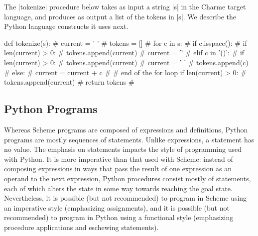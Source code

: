 The \pycode|tokenize| procedure below takes as input a string \pycode|s| in the Charme target language, and produces as output a list of the tokens in \pycode|s|.  We describe the Python language constructs it uses next.
\begin{pythoncode}
def tokenize(s):   # 
    current = ' '  # 
    tokens = []    # 
    for c in s:    # 
        if c.isspace():   # 
            if len(current) > 0:   # 
                tokens.append(current)   # 
                current = ''   # 
        elif c in '()':   # 
            if len(current) > 0:   # 
                tokens.append(current)   # 
                current = ' '  # 
            tokens.append(c)   # 
        else:   # 
            current = current + c   # 
    # end of the for loop 
    if len(current) > 0:   # 
        tokens.append(current)   # 
    return tokens   # 
\end{pythoncode}

\subsection{Python Programs}

Whereas Scheme programs are composed of expressions and definitions, Python programs are mostly sequences of statements.  Unlike expressions, a statement has no value.  The emphasis on statements impacts the style of programming used with Python.  It is more imperative than that used with Scheme: instead of composing expressions in ways that pass the result of one expression as an operand to the next expression, Python procedures consist mostly of statements, each of which alters the state in some way towards reaching the goal state.  Nevertheless, it is possible (but not recommended) to program in Scheme using an imperative style (emphasizing assignments), and it is possible (but not recommended) to program in Python using a functional style (emphasizing procedure applications and eschewing statements).

